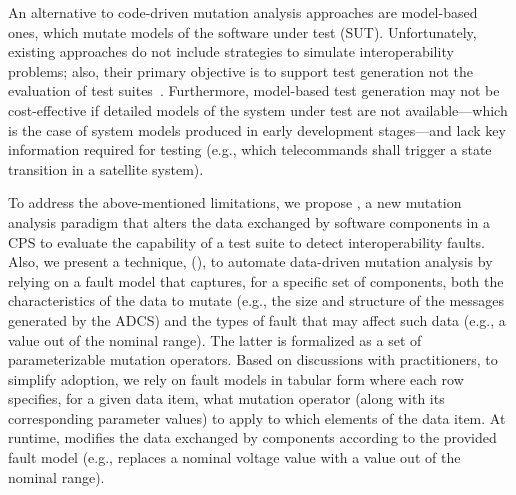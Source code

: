 An alternative to code-driven mutation analysis approaches are model-based ones, which mutate models of the software under test (SUT). 
Unfortunately, existing approaches do not include strategies to simulate interoperability problems; also, their primary objective is to support test generation not the evaluation of test suites~\cite{He2011,Aichernig2015,Devroey2016,BELLI201625}. 
Furthermore, model-based test generation may not be cost-effective if detailed models of the system under test are not available---which is the case of system models produced in early development stages---and lack key information required for testing (e.g., which telecommands shall trigger a state transition in a satellite system). 
%

To address the above-mentioned limitations, we propose , 
a new mutation analysis paradigm
that alters the data exchanged by software components in a CPS to evaluate the capability of a test suite to detect interoperability faults. Also, we present a technique,  (\APPR),
to automate data-driven mutation analysis by relying on
a fault model that captures, for a specific set of components, both the characteristics of the data to mutate (e.g., the size and structure of the messages generated by the ADCS) and the types of fault that may affect such data (e.g., a  value out of the nominal range). The latter is formalized as a set of parameterizable mutation operators. 
Based on discussions with practitioners, to simplify adoption, we rely on fault models in tabular form where each row specifies, for a given data item, what mutation operator (along with its corresponding parameter values) to apply to which elements of the data item.
At runtime, \APPR modifies the data exchanged by components according to the provided fault model (e.g., replaces a nominal voltage value with a value out of the nominal range).

